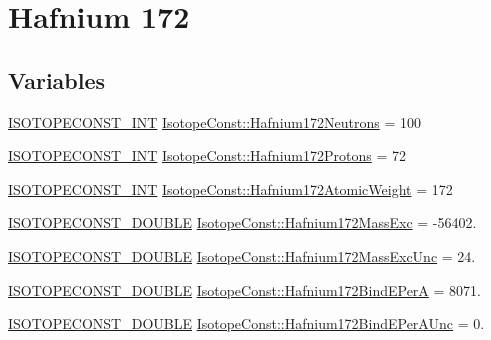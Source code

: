 \hypertarget{group___isotope_const-_hafnium-_hf172}{}\section{Hafnium 172}
\label{group___isotope_const-_hafnium-_hf172}
\subsection*{Variables}
\begin{DoxyCompactItemize}
\item 
\mbox{\hyperlink{group___isotope_const-_macros_ga5f18360b3e99483a35c32d789e62621c}{I\+S\+O\+T\+O\+P\+E\+C\+O\+N\+S\+T\+\_\+\+I\+NT}} \mbox{\hyperlink{group___isotope_const-_hafnium-_hf172_gabb339a0e3b4dcfd22d3f10616cba09d9}{Isotope\+Const\+::\+Hafnium172\+Neutrons}} = 100
\item 
\mbox{\hyperlink{group___isotope_const-_macros_ga5f18360b3e99483a35c32d789e62621c}{I\+S\+O\+T\+O\+P\+E\+C\+O\+N\+S\+T\+\_\+\+I\+NT}} \mbox{\hyperlink{group___isotope_const-_hafnium-_hf172_gac952e84055ada72a148bfb4f6c5d9d1c}{Isotope\+Const\+::\+Hafnium172\+Protons}} = 72
\item 
\mbox{\hyperlink{group___isotope_const-_macros_ga5f18360b3e99483a35c32d789e62621c}{I\+S\+O\+T\+O\+P\+E\+C\+O\+N\+S\+T\+\_\+\+I\+NT}} \mbox{\hyperlink{group___isotope_const-_hafnium-_hf172_ga9f8af1d0d195cbe6535068dd37ada879}{Isotope\+Const\+::\+Hafnium172\+Atomic\+Weight}} = 172
\item 
\mbox{\hyperlink{group___isotope_const-_macros_ga8f45a7272ce02c0b4c65c44636ed719a}{I\+S\+O\+T\+O\+P\+E\+C\+O\+N\+S\+T\+\_\+\+D\+O\+U\+B\+LE}} \mbox{\hyperlink{group___isotope_const-_hafnium-_hf172_gae9d18a68e1c70de92ec844d584ab4b22}{Isotope\+Const\+::\+Hafnium172\+Mass\+Exc}} = -\/56402.
\item 
\mbox{\hyperlink{group___isotope_const-_macros_ga8f45a7272ce02c0b4c65c44636ed719a}{I\+S\+O\+T\+O\+P\+E\+C\+O\+N\+S\+T\+\_\+\+D\+O\+U\+B\+LE}} \mbox{\hyperlink{group___isotope_const-_hafnium-_hf172_ga103949e9edcc9d82cd8426c2d838128a}{Isotope\+Const\+::\+Hafnium172\+Mass\+Exc\+Unc}} = 24.
\item 
\mbox{\hyperlink{group___isotope_const-_macros_ga8f45a7272ce02c0b4c65c44636ed719a}{I\+S\+O\+T\+O\+P\+E\+C\+O\+N\+S\+T\+\_\+\+D\+O\+U\+B\+LE}} \mbox{\hyperlink{group___isotope_const-_hafnium-_hf172_gab48e6d7ec8e803a854ff90eecdf73a4c}{Isotope\+Const\+::\+Hafnium172\+Bind\+E\+PerA}} = 8071.
\item 
\mbox{\hyperlink{group___isotope_const-_macros_ga8f45a7272ce02c0b4c65c44636ed719a}{I\+S\+O\+T\+O\+P\+E\+C\+O\+N\+S\+T\+\_\+\+D\+O\+U\+B\+LE}} \mbox{\hyperlink{group___isotope_const-_hafnium-_hf172_ga43dfa4de6fdb45c6102a0fab1935019b}{Isotope\+Const\+::\+Hafnium172\+Bind\+E\+Per\+A\+Unc}} = 0.

\end{DoxyCompactItemize}
